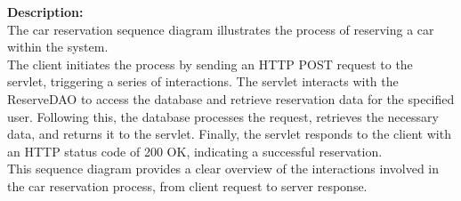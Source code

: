 \textbf{Description:}\\
The car reservation sequence diagram illustrates the process of reserving a car within the system.\\
The client initiates the process by sending an HTTP POST request to the servlet, triggering a series of interactions. The servlet interacts with the ReserveDAO to access the database and retrieve reservation data for the specified user. Following this, the database processes the request, retrieves the necessary data, and returns it to the servlet. Finally, the servlet responds to the client with an HTTP status code of 200 OK, indicating a successful reservation.\\
This sequence diagram provides a clear overview of the interactions involved in the car reservation process, from client request to server response.\newpage